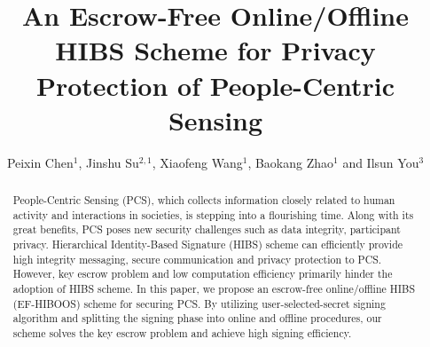 \documentclass[times]{secauth}
\theoremstyle{definition}
\theoremstyle{remark}
\begin{document}


\title{An Escrow-Free Online/Offline HIBS Scheme for Privacy Protection of People-Centric Sensing}

\author{Peixin Chen$^1$\corrauth, Jinshu Su$^{2, 1}$, Xiaofeng Wang$^1$, Baokang Zhao$^1$ and Ilsun You$^3$}

\address{$^1$ College of Computer, National University of Defense Technology, Changsha 410073, China\\
$^2$ State Key Laboratory of High Performance Computing, National University of Defense Technology, Changsha 410073, China\\
$^3$ Department of Information Security Engineering, Soonchunhyang University, Asan-si, Republic of Korea}


\begin{abstract}
People-Centric Sensing (PCS), which collects information closely related to human activity and interactions in societies, is stepping into a flourishing time. 
Along with its great benefits, PCS poses new security challenges such as data integrity, participant privacy. 
Hierarchical Identity-Based Signature (HIBS) scheme can efficiently provide high integrity messaging, secure communication and privacy protection to PCS.
However, key escrow problem and low computation efficiency primarily hinder the adoption of HIBS scheme.
In this paper, we propose an escrow-free online/offline HIBS (EF-HIBOOS) scheme for securing PCS.
By utilizing user-selected-secret signing algorithm and splitting the signing phase into online and offline procedures, our scheme solves the key escrow problem and achieve high signing efficiency.
\end{abstract}


\maketitle

\end{document}
